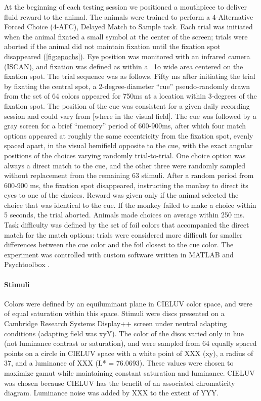 At the beginning of each testing session we positioned a mouthpiece to deliver fluid reward to the animal.
The animals were trained to perform a 4-Alternative Forced Choice (4-AFC), Delayed Match to Sample task.
Each trial was initiated when the animal fixated a small symbol at the center of the screen; trials were aborted if the animal did not maintain fixation until the fixation spot disappeared (\autoref{fig:epochs}). 
Eye position was monitored with an infrared camera (ISCAN), and fixation was defined as within a ~1o wide area centered on the fixation spot. 
The trial sequence was as follows. Fifty ms after initiating the trial by fixating the central spot, a 2-degree-diameter “cue” pseudo-randomly drawn from the set of 64 colors appeared for 750ms at a location within 3-degrees of the fixation spot. 
The position of the cue was consistent for a given daily recording session and could vary from [where in the visual field]. 
The cue was followed by a gray screen for a brief “memory” period of 600-900ms, after which four match options appeared at roughly the same eccentricity from the fixation spot, evenly spaced apart, in the visual hemifield opposite to the cue, with the exact angular positions of the choices varying randomly trial-to-trial. 
One choice option was always a direct match to the cue, and the other three were randomly sampled without replacement from the remaining 63 stimuli. 
After a random period from 600-900 ms, the fixation spot disappeared, instructing the monkey to direct its eyes to one of the choices. 
Reward was given only if the animal selected the choice that was identical to the cue. 
If the monkey failed to make a choice within 5 seconds, the trial aborted.
Animals made choices on average within 250 ms. 
Task difficulty was defined by the set of foil colors that accompanied the direct match for the match options: trials were considered more difficult for smaller differences between the cue color and the foil closest to the cue color. 
The experiment was controlled with custom software written in MATLAB and Psychtoolbox \citep{noauthor_nei-lsrkofiko_2022, kleiner_whats_2007}.

\paragraph{Stimuli}
Colors were defined by an equiluminant plane in CIELUV color space, and were of equal saturation within this space. 
Stimuli were discs presented on a Cambridge Research Systems Display++ screen under neutral adapting conditions (adapting field was xyY). 
The color of the discs varied only in hue (not luminance contrast or saturation), and were sampled from 64 equally spaced points on a circle in CIELUV space with a white point of XXX (xy), a radius of 37, and a luminance of XXX (L* = 76.0693). 
These values were chosen to maximize gamut while maintaining constant saturation and luminance. 
CIELUV was chosen because CIELUV has the benefit of an associated chromaticity diagram. 
Luminance noise was added by XXX to the extent of YYY. 

